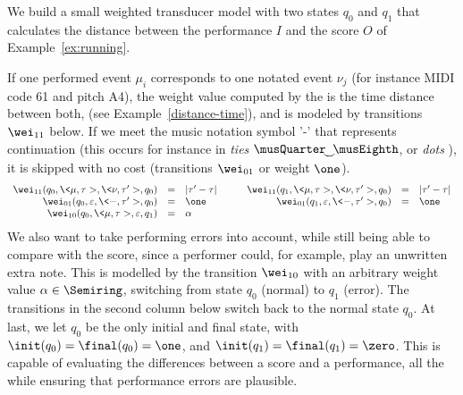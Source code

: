 \begin{example}\label{ex:SWT}
We build a small weighted transducer model
with two states $q_0$ and $q_1$ that
calculates the distance between the performance $I$ and
the score $O$ of Example~\ref{ex:running}.

If one performed event $\mu_i$  corresponds
to one notated event $\nu_j$ (for instance MIDI code 61 and pitch A4),
the weight value computed by the \SWT is the time distance between both,
(see Example~\ref{distance-time}), and is modeled by
transitions $\wei_{11}$ below.
%
If we meet the music notation symbol '-' that
represents continuation (this occurs for instance in \emph{ties}
$\musQuarter\!\!\!\mathrel{\raisebox{-1.5mm}{$\smile$}}\!\!\!\musEighth$,
or \emph{dots} \musQuarterDotted{}), it is  skipped with no cost (transitions $\wei_{01}$ or weight $\one$).
\[
\begin{array}{rclcrcl}
\wei_{11}(q_0, \<\mu, \tau>, \<\nu, \tau'>, q_0) & = & |\tau' - \tau| & \quad &
\wei_{11}(q_1, \<\mu, \tau>, \<\nu, \tau'>, q_0) & = & |\tau' - \tau|\\
\wei_{01}(q_0, \varepsilon, \< \mathsf{-}, \tau'>, q_0) & = & \one & &
\wei_{01}(q_1, \varepsilon, \< \mathsf{-}, \tau'>, q_0) & = & \one\\
\wei_{10}(q_0, \<\mu, \tau>, \varepsilon, q_1) & = & \alpha & & %
\end{array}
\]
%
We also want to take performing errors into account, while still being able to compare with the score,
since a performer could, for example, play an unwritten extra note.
%
This is modelled by the transition $\wei_{10}$ with an arbitrary weight value $\alpha \in \Semiring$,
switching from state $q_0$ (normal) to $q_1$ (error).
The transitions in the second column below switch back to the normal state $q_0$.
At last, we let $q_0$ be the only initial and final state, with
$\init(q_0) = \final(q_0) = \one$, and
$\init(q_1) = \final(q_1) = \zero$.
This \SWT is capable of evaluating the differences between a score and a performance,
all the while ensuring that performance errors are plausible.
\endex
\end{example}



